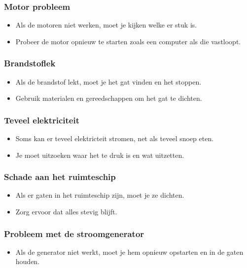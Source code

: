 \subsubsection{Motor probleem}
\begin{itemize}
    \item Als de motoren niet werken, moet je kijken welke er stuk is.
    \item Probeer de motor opnieuw te starten zoals een computer als die vastloopt.
\end{itemize}

\subsubsection{Brandstoflek}
\begin{itemize}
    \item Als de brandstof lekt, moet je het gat vinden en het stoppen.
    \item Gebruik materialen en gereedschappen om het gat te dichten.
\end{itemize}

\subsubsection{Teveel elektriciteit}
\begin{itemize}
    \item Soms kan er teveel elektricteit stromen, net als teveel snoep eten.
    \item Je moet uitzoeken waar het te druk is en wat uitzetten.
\end{itemize}

\subsubsection{Schade aan het ruimteschip}
\begin{itemize}
    \item Als er gaten in het ruimteschip zijn, moet je ze dichten.
    \item Zorg ervoor dat alles stevig blijft.
\end{itemize}

\subsubsection{Probleem met de stroomgenerator}
\begin{itemize}
    \item Als de generator niet werkt, moet je hem opnieuw opstarten en in de gaten houden.
\end{itemize}

